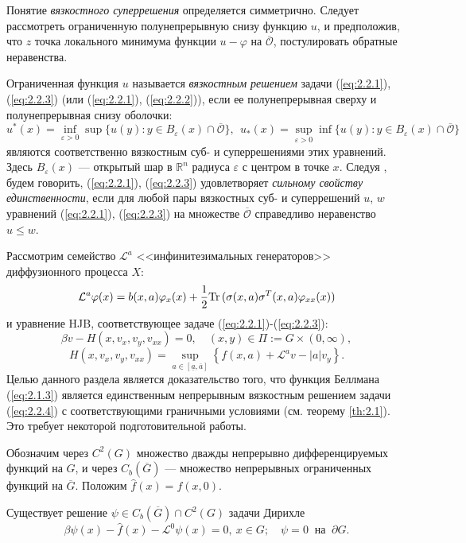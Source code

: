 Понятие \emph{вязкостного суперрешения} определяется симметрично. Следует рассмотреть ограниченную полунепрерывную снизу функцию $u$, и предположив, что  $z$ точка локального минимума функции  $u-\varphi$ на $\overline{\mathcal O}$, постулировать обратные неравенства.

Ограниченная функция $u$ называется \emph{вязкостным решением} задачи (\ref{eq:2.2.1}), (\ref{eq:2.2.3}) (или (\ref{eq:2.2.1}), (\ref{eq:2.2.2})), если ее полунепрерывная сверху и полунепрерывная снизу оболочки:
$$ u^*(x)=\inf_{\varepsilon>0}\sup\{ u(y): y\in B_\varepsilon(x)\cap\overline {\mathcal O}\},\ \
   u_*(x)=\sup_{\varepsilon>0}\inf\{ u(y): y\in B_\varepsilon(x)\cap\overline {\mathcal O}\}$$
являются соответственно вязкостным суб- и суперрешениями этих уравнений. Здесь $B_\varepsilon(x)$ --- открытый шар в $\mathbb R^n$ радиуса $\varepsilon$ с центром в точке $x$. Следуя \cite{BarSou91}, будем говорить, (\ref{eq:2.2.1}), (\ref{eq:2.2.3}) удовлетворяет \emph{сильному свойству единственности}, если для любой пары вязкостных суб- и суперрешений $u$, $w$ уравнений (\ref{eq:2.2.1}), (\ref{eq:2.2.3}) на множестве $\overline{\mathcal O}$ справедливо неравенство $u\le w$.

Рассмотрим семейство $\mathcal L^a$ <<инфинитезимальных генераторов>> диффузионного процесса $X$:
$$ \mathcal L^a\varphi(x)=b(x,a)\varphi_x(x)+ \frac{1}{2}{\rm Tr\,}(\sigma(x,a)\sigma^T(x,a)\varphi_{xx}(x))$$
и уравнение HJB, соответствующее задаче (\ref{eq:2.2.1})-(\ref{eq:2.2.3}):
\begin{equation} \label{eq:2.2.4}
\beta v- H(x,v_x,v_y,v_{xx})=0,\quad (x,y)\in \Pi:=G\times (0,\infty),
\end{equation}
$$H(x,v_x,v_y,v_{xx})=\sup_{a \in [\underline a, \overline a]} \left\{f(x,a)+ \mathcal L^a v-|a|v_y \right\}.$$
Целью данного раздела является доказательство того, что функция Беллмана (\ref{eq:2.1.3}) является единственным непрерывным вязкостным решением задачи (\ref{eq:2.2.4}) с соответствующими граничными условиями (см. теорему \ref{th:2.1}). Это требует некоторой подготовительной работы.

Обозначим через $C^2(G)$ множество дважды непрерывно дифференцируемых функций на $G$, и через $C_b(\overline G)$ --- множество непрерывных ограниченных функций на $\overline G$. Положим $\widehat f(x)=f(x,0)$.

\begin{assumption} \label{as:2.1}
Существует решение $\psi\in C_b(\overline G)\cap C^2(G)$ задачи Дирихле
\begin{equation} \label{eq:2.2.5}
\beta\psi(x)-\widehat f(x)-\mathcal L^0\psi (x)=0,  \ x\in G; \quad \psi=0 \ \textrm{ на }\ \partial G.
\end{equation}
\end{assumption}

